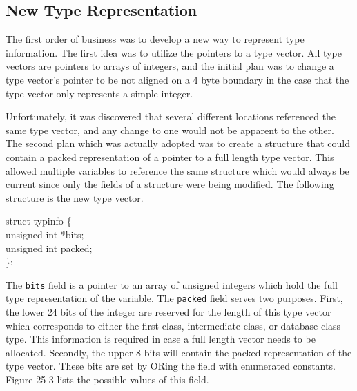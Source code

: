 \subsection{New Type Representation}

The first order of business was to develop a new way to represent type
information. The first idea was to utilize the pointers to a type
vector. All type vectors are pointers to arrays of integers, and the
initial plan was to change a type vector's pointer to be not aligned
on a 4 byte boundary in the case that the type vector only represents
a simple integer.

Unfortunately, it was discovered that several different locations
referenced the same type vector, and any change to one would not be
apparent to the other. The second plan which was actually adopted was
to create a structure that could contain a packed representation of a
pointer to a full length type vector. This allowed multiple variables
to reference the same structure which would always be current since
only the fields of a structure were being modified.  The following
structure is the new type vector.

\goodbreak
\begin{iconcode}
struct typinfo \{\\
\>unsigned int *bits;\\
\>unsigned int packed;\\
\};\\
\end{iconcode}


The \texttt{bits} field is a pointer to an array of unsigned integers
which hold the full type representation of the variable. The
\texttt{packed} field serves two purposes. First, the lower 24 bits of
the integer are reserved for the length of this type vector which
corresponds to either the first class, intermediate class, or database
class type. This information is required in case a full length vector
needs to be allocated. Secondly, the upper 8 bits will contain the
packed representation of the type vector. These bits are set by ORing
the field with enumerated constants. Figure 25-3 lists the possible
values of this field.

